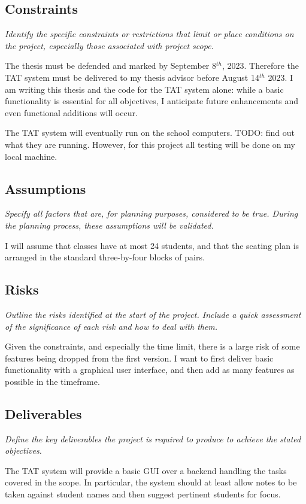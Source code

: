 \documentclass[10pt]{article}
\begin{document}
\subsection{Constraints} 
\emph{Identify the specific constraints or restrictions that limit or place conditions on the project, especially those associated with project scope.}

The thesis must be defended and marked by September 8$^{th}$, 2023. Therefore the TAT system must be delivered to my thesis advisor before August 14$^{th}$ 2023. I am writing this thesis and the code for the TAT system alone: while a basic functionality is essential for all objectives, I anticipate future enhancements and even functional additions will occur.

The TAT system will eventually run on the school computers. TODO: find out what they are running. However, for this project all testing will be done on my local machine.

\subsection{Assumptions} 
\emph{Specify all factors that are, for planning purposes, considered to be true. During the planning process, these assumptions will be validated.}

I will assume that classes have at most 24 students, and that the seating plan is arranged in the standard three-by-four blocks of pairs.

\subsection{Risks} 
\emph{Outline the risks identified at the start of the project. Include a quick assessment of the significance of each risk and how to deal with them.}

Given the constraints, and especially the time limit, there is a large risk of some features being dropped from the first version. I want to first deliver basic functionality with a graphical user interface, and then add as many features as possible in the timeframe.

\subsection{Deliverables} 
\emph{Define the key deliverables the project is required to produce to achieve the stated objectives.}

The TAT system will provide a basic GUI over a backend handling the tasks covered in the scope. In particular, the system should at least allow notes to be taken against student names and then suggest pertinent students for focus.
\end{document}
